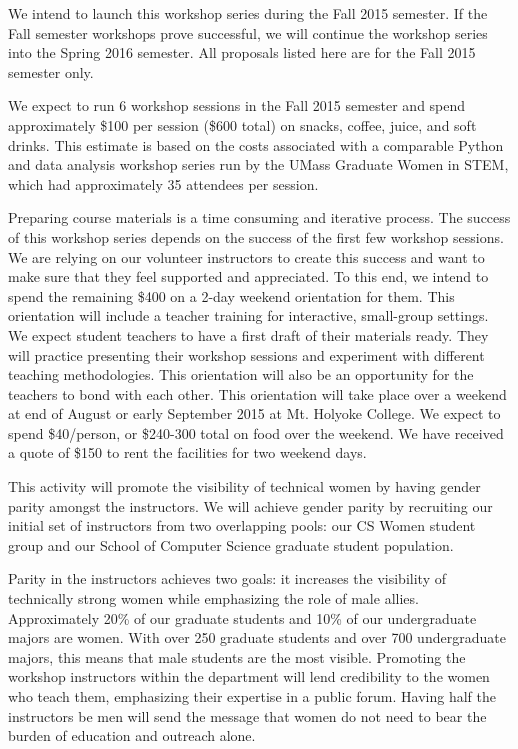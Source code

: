 \documentclass{article}
\begin{document}

We intend to launch this workshop series during the Fall 2015 semester. If the Fall semester workshops prove successful, we will continue the workshop series into the Spring 2016 semester. All proposals listed here are for the Fall 2015 semester only.

We expect to run 6 workshop sessions in the Fall 2015 semester and spend approximately \$100 per session (\$600 total) on snacks, coffee, juice, and soft drinks.  This estimate is based on the costs associated with a comparable Python and data analysis workshop series run by the UMass Graduate Women in STEM, which had approximately 35 attendees per session.

Preparing course materials is a time consuming and iterative process. The success of this workshop series depends on the success of the first few workshop sessions. We are relying on our volunteer instructors to create this success and want to make sure that they feel supported and appreciated. To this end, we intend to spend the remaining \$400 on a 2-day weekend orientation for them. This orientation will include a teacher training for interactive, small-group settings. We expect student teachers to have a first draft of their materials ready. They will practice presenting their workshop sessions and experiment with different teaching methodologies. This orientation will also be an opportunity for the teachers to bond with each other. This orientation will take place over a weekend at end of August or early September 2015 at Mt. Holyoke College. We expect to spend \$40/person, or \$240-300 total on food over the weekend. We have received a quote of \$150 to rent the facilities for two weekend days.



 This activity will promote the visibility of technical women by having gender parity amongst the instructors. We will achieve gender parity by recruiting our initial set of instructors from two overlapping pools: our CS Women student group and our School of Computer Science graduate student population.
 
Parity in the instructors achieves two goals: it increases the visibility of technically strong women while emphasizing the role of male allies. Approximately 20\% of our graduate students and 10\% of our undergraduate majors are women. With over 250 graduate students and over 700 undergraduate majors, this means that male students are the most visible. Promoting the workshop instructors within the department will lend credibility to the women who teach them, emphasizing their expertise in a public forum. Having half the instructors be men will send the message that women do not need to bear the burden of education and outreach alone.
\end{document}
